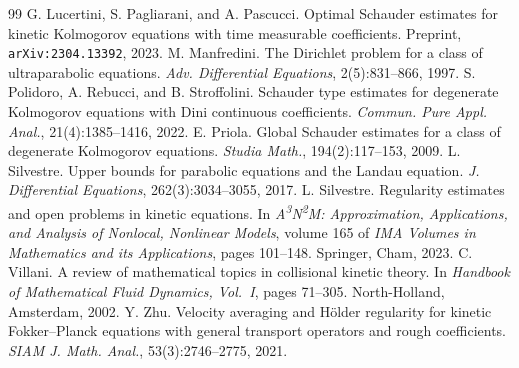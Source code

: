 \documentclass[10pt,a4paper]{amsart}
\numberwithin{equation}{section}
\begin{document}
\begin{thebibliography}{99}
 G. Lucertini, S. Pagliarani, and A. Pascucci. \newblock Optimal Schauder estimates for kinetic Kolmogorov equations with time measurable coefficients. \newblock Preprint, \texttt{arXiv:2304.13392}, 2023.
 M. Manfredini. \newblock The Dirichlet problem for a class of ultraparabolic equations. \newblock \emph{Adv. Differential Equations}, 2(5):831--866, 1997.
 S. Polidoro, A. Rebucci, and B. Stroffolini. \newblock Schauder type estimates for degenerate Kolmogorov equations with Dini continuous coefficients. \newblock \emph{Commun. Pure Appl. Anal.}, 21(4):1385--1416, 2022.
 E. Priola. \newblock Global Schauder estimates for a class of degenerate Kolmogorov equations. \newblock \emph{Studia Math.}, 194(2):117--153, 2009.
 L. Silvestre. \newblock Upper bounds for parabolic equations and the Landau equation. \newblock \emph{J. Differential Equations}, 262(3):3034--3055, 2017.
 L. Silvestre. \newblock Regularity estimates and open problems in kinetic equations. \newblock In \emph{A\textsuperscript{3}N\textsuperscript{2}M: Approximation, Applications, and Analysis of Nonlocal, Nonlinear Models}, volume 165 of \emph{IMA Volumes in Mathematics and its Applications}, pages 101--148. Springer, Cham, 2023.
 C. Villani. \newblock A review of mathematical topics in collisional kinetic theory. \newblock In \emph{Handbook of Mathematical Fluid Dynamics, Vol.~I}, pages 71--305. North-Holland, Amsterdam, 2002.
 Y. Zhu. \newblock Velocity averaging and H\"older regularity for kinetic Fokker--Planck equations with general transport operators and rough coefficients. \newblock \emph{SIAM J. Math. Anal.}, 53(3):2746--2775, 2021.
\end{thebibliography}
\end{document}
